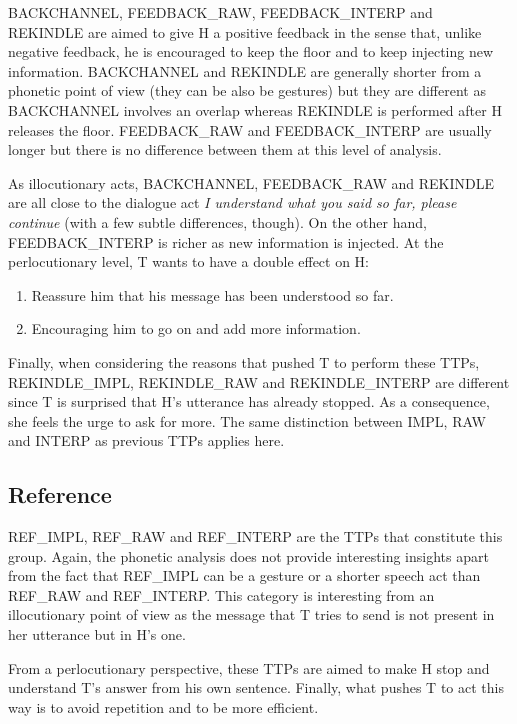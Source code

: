 					BACKCHANNEL, FEEDBACK\_RAW, FEEDBACK\_INTERP and REKINDLE are aimed to give H a positive feedback in the sense that, unlike negative feedback, he is encouraged to keep the floor and to keep injecting new information. BACKCHANNEL and REKINDLE are generally shorter from a phonetic point of view (they can be also be gestures) but they are different as BACKCHANNEL involves an overlap whereas REKINDLE is performed after H releases the floor. FEEDBACK\_RAW and FEEDBACK\_INTERP are usually longer but there is no difference between them at this level of analysis.
					
					As illocutionary acts, BACKCHANNEL, FEEDBACK\_RAW and REKINDLE are all close to the dialogue act \textit{I understand what you said so far, please continue} (with a few subtle differences, though). On the other hand, FEEDBACK\_INTERP is richer as new information is injected. At the perlocutionary level, T wants to have a double effect on H:
					\begin{enumerate}
						\item Reassure him that his message has been understood so far.
						\item Encouraging him to go on and add more information.
					\end{enumerate}
					
					Finally, when considering the reasons that pushed T to perform these TTPs, REKINDLE\_IMPL, REKINDLE\_RAW and REKINDLE\_INTERP are different since T is surprised that H's utterance has already stopped. As a consequence, she feels the urge to ask for more. The same distinction between IMPL, RAW and INTERP as previous TTPs applies here.

    \subsection{Reference}
		
					REF\_IMPL, REF\_RAW and REF\_INTERP are the TTPs that constitute this group. Again, the phonetic analysis does not provide interesting insights apart from the fact that REF\_IMPL can be a gesture or a shorter speech act than REF\_RAW and REF\_INTERP. This category is interesting from an illocutionary point of view as the message that T tries to send is not present in her utterance but in H's one.
					
					From a perlocutionary perspective, these TTPs are aimed to make H stop and understand T's answer from his own sentence. Finally, what pushes T to act this way is to avoid repetition and to be more efficient.

